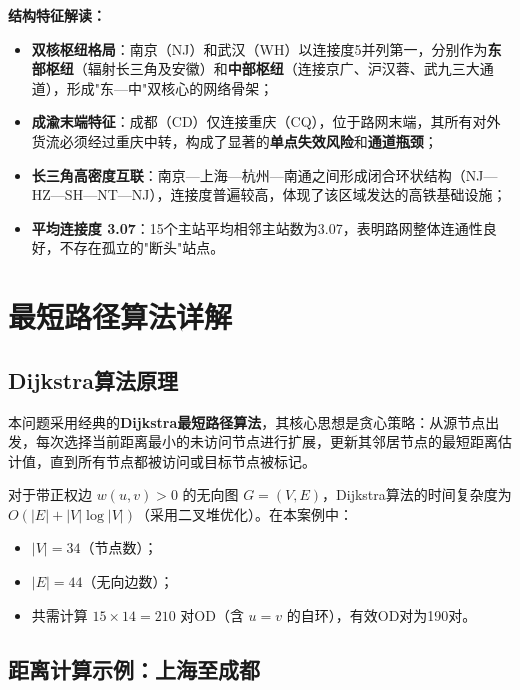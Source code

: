 \documentclass[12pt,a4paper,fontset=none]{ctexart}
\begin{document}
\textbf{结构特征解读：}

\begin{itemize}
    \item \textbf{双核枢纽格局}：南京（NJ）和武汉（WH）以连接度5并列第一，分别作为\textbf{东部枢纽}（辐射长三角及安徽）和\textbf{中部枢纽}（连接京广、沪汉蓉、武九三大通道），形成"东—中"双核心的网络骨架；
    \item \textbf{成渝末端特征}：成都（CD）仅连接重庆（CQ），位于路网末端，其所有对外货流必须经过重庆中转，构成了显著的\textbf{单点失效风险}和\textbf{通道瓶颈}；
    \item \textbf{长三角高密度互联}：南京—上海—杭州—南通之间形成闭合环状结构（NJ—HZ—SH—NT—NJ），连接度普遍较高，体现了该区域发达的高铁基础设施；
    \item \textbf{平均连接度 3.07}：15个主站平均相邻主站数为3.07，表明路网整体连通性良好，不存在孤立的"断头"站点。
\end{itemize}

\section{最短路径算法详解}

\subsection{Dijkstra算法原理}

本问题采用经典的\textbf{Dijkstra最短路径算法}，其核心思想是贪心策略：从源节点出发，每次选择当前距离最小的未访问节点进行扩展，更新其邻居节点的最短距离估计值，直到所有节点都被访问或目标节点被标记。

对于带正权边 $w(u,v) > 0$ 的无向图 $G=(V,E)$，Dijkstra算法的时间复杂度为 $O(|E| + |V|\log|V|)$（采用二叉堆优化）。在本案例中：

\begin{itemize}
    \item $|V| = 34$（节点数）；
    \item $|E| = 44$（无向边数）；
    \item 共需计算 $15 \times 14 = 210$ 对OD（含 $u=v$ 的自环），有效OD对为190对。
\end{itemize}

\subsection{距离计算示例：上海至成都}
\end{document}
